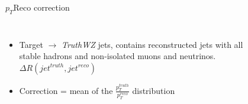 \begin{frame}{$p_T$Reco correction}
\begin{columns}
\begin{itemize}
    \item Target $\to$ \textit{TruthWZ} jets, contains reconstructed jets with all stable hadrons and non-isolated muons and neutrinos. $\Delta R(jet^{truth}, jet^{reco})$
    \item Correction = mean of the $\frac{p_T^{truth}}{p_T^{reco}}$ distribution
\end{itemize}

\begin{figure}
    \centering
    \\
\end{figure}
\end{columns}
\end{frame}

